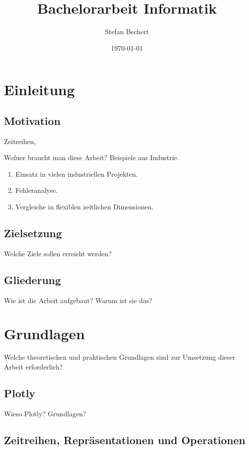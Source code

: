 \documentclass[12pt]{article}
\title{Bachelorarbeit Informatik}
\author{Stefan Bechert}
\date{\today}
\begin{document}
\maketitle
\newpage
\tableofcontents
\newpage

\section{Einleitung}
	\subsection{Motivation}
		Zeitreihen, 
	
		Wofuer braucht man diese Arbeit? Beispiele aus Industrie.
		\begin{enumerate}
			\item{Einsatz in vielen industriellen Projekten.}
			\item{Fehleranalyse.}
			\item{Vergleiche in flexiblen zeitlichen Dimensionen.}
		\end{enumerate}
	\subsection{Zielsetzung}
		Welche Ziele sollen erreicht werden? 
	\subsection{Gliederung}
		Wie ist die Arbeit aufgebaut? Warum ist sie das?
		
\section{Grundlagen}
		Welche theoretischen und praktischen Grundlagen sind zur Umsetzung dieser Arbeit erforderlich?
	\subsection{Plotly}
		Wieso Plotly? Grundlagen?
	\subsection{Zeitreihen, Repräsentationen und Operationen}
\end{document}

